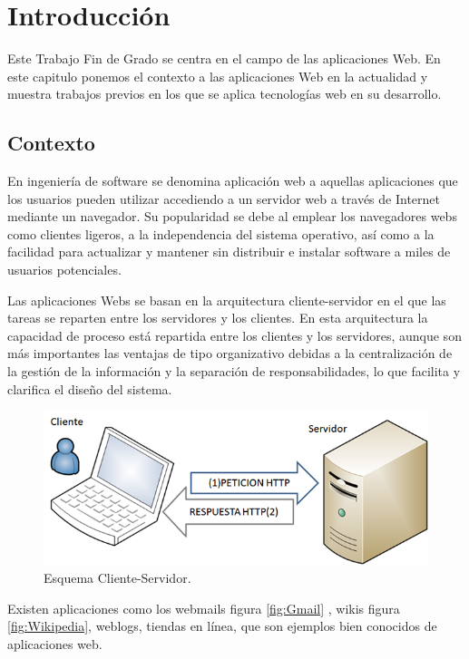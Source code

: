 \chapter{Introducción}
Este Trabajo Fin de Grado se centra en el campo de las aplicaciones Web. En este capitulo ponemos el contexto a las aplicaciones Web en la actualidad y muestra trabajos previos en los que se aplica tecnologías web en su desarrollo.
\section{Contexto}
En ingeniería de software se denomina aplicación web a aquellas aplicaciones
que los usuarios pueden utilizar accediendo a un servidor web a través de Internet
mediante un navegador. Su popularidad se debe al emplear los navegadores webs como clientes ligeros, a la independencia del sistema operativo, así como a la facilidad para actualizar y mantener sin distribuir e instalar software a miles de usuarios potenciales. 

Las aplicaciones Webs se basan en la arquitectura 
cliente-servidor en el que las tareas se reparten entre los servidores y los clientes.
En esta arquitectura la capacidad de proceso está repartida entre los clientes y los
servidores, aunque son más importantes las ventajas de tipo organizativo debidas
a la centralización de la gestión de la información y la separación de
responsabilidades, lo que facilita y clarifica el diseño del sistema.

\begin{figure}[!h]
\centering
\includegraphics[width=0.5\linewidth]{Figures/Cliente_Servidor}
\decoRule
\caption[Esquema Cliente-Servidor]{Esquema Cliente-Servidor.}
\label{fig:Cliente_Servidor}
\end{figure}

Existen aplicaciones como los webmails figura \ref{fig:Gmail} , wikis figura \ref{fig:Wikipedia},
weblogs, tiendas en línea, que son ejemplos bien conocidos de aplicaciones web.

